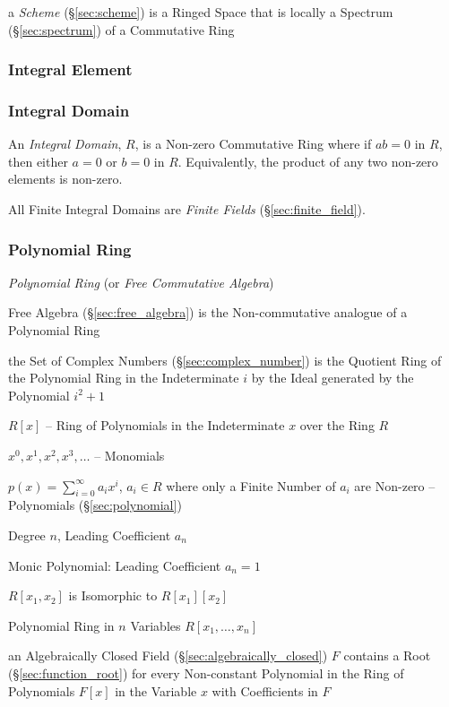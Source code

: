 \fist a \emph{Scheme} (\S\ref{sec:scheme}) is a Ringed Space that is locally a
Spectrum (\S\ref{sec:spectrum}) of a Commutative Ring



\subsubsection{Integral Element}\label{sec:integral_element}

\subsubsection{Integral Domain}\label{sec:integral_domain}

An \emph{Integral Domain}, $R$, is a Non-zero Commutative Ring where
if $ab = 0$ in $R$, then either $a = 0$ or $b = 0$ in $R$.
Equivalently, the product of any two non-zero elements is non-zero.

All Finite Integral Domains are \emph{Finite Fields}
(\S\ref{sec:finite_field}).



\subsubsection{Polynomial Ring}\label{sec:polynomial_ring}

\emph{Polynomial Ring} (or \emph{Free Commutative Algebra})

Free Algebra (\S\ref{sec:free_algebra}) is the Non-commutative
analogue of a Polynomial Ring

the Set of Complex Numbers (\S\ref{sec:complex_number}) is the Quotient Ring of
the Polynomial Ring in the Indeterminate $i$ by the Ideal generated by the
Polynomial $i^2 + 1$

$R[x]$ -- Ring of Polynomials in the Indeterminate $x$ over the Ring $R$

$x^0, x^1, x^2, x^3, \ldots$ -- Monomials

$p(x) = \sum_{i=0}^\infty a_i x^i$, $a_i \in R$ where only a Finite Number of
$a_i$ are Non-zero -- Polynomials (\S\ref{sec:polynomial})

Degree $n$, Leading Coefficient $a_n$

Monic Polynomial: Leading Coefficient $a_n = 1$

$R[x_1, x_2]$ is Isomorphic to $R[x_1][x_2]$

Polynomial Ring in $n$ Variables $R[x_1, \ldots, x_n]$

an Algebraically Closed Field (\S\ref{sec:algebraically_closed}) $F$ contains a
Root (\S\ref{sec:function_root}) for every Non-constant Polynomial in the Ring
of Polynomials $F[x]$ in the Variable $x$ with Coefficients in $F$

